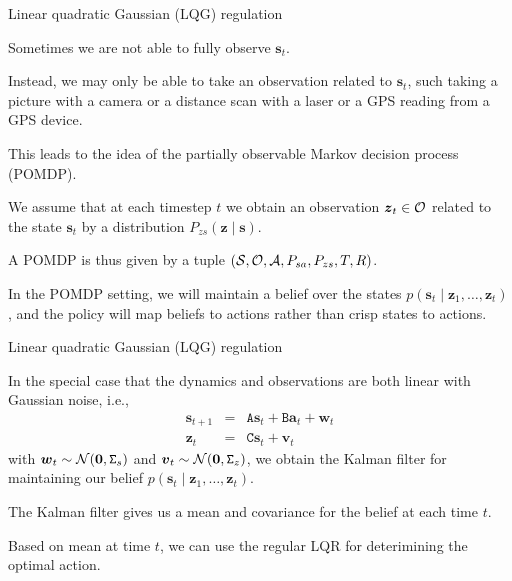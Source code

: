 \documentclass{beamer}
\renewcommand{\vec}[1]{\boldsymbol{#1}}
\newcommand{\mat}[1]{\mathtt{#1}}
\begin{document}
\begin{frame}{Linear quadratic Gaussian (LQG) regulation}

  Sometimes we are not able to fully observe $\vec{s}_t$.

  \medskip

  Instead, we may only be able to take an \alert{observation} related
  to $\vec{s}_t$, such taking a picture with a camera or a distance
  scan with a laser or a GPS reading from a GPS device.

  \medskip

  This leads to the idea of the \alert{partially observable Markov
    decision process (POMDP)}.

  \medskip

  We assume that at each timestep $t$ we obtain an observation
  $\vec{z}_t \in {\cal O}$ related to the state $\vec{s}_t$ by a distribution
  $P_{zs}(\vec{z} \mid \vec{s})$.

  \medskip

  A POMDP is thus given by a tuple $({\cal S},{\cal O},{\cal
    A},P_{sa},P_{zs},T,R)$.

  \medskip
  
  In the POMDP setting, we will maintain a \alert{belief} over the states
  $p(\vec{s}_t \mid \vec{z}_1, \ldots, \vec{z}_t)$, and the policy will map
  beliefs to actions rather than crisp states to actions.
  
\end{frame}


\begin{frame}{Linear quadratic Gaussian (LQG) regulation}

  In the special case that the dynamics and observations are both linear
  with Gaussian noise, i.e.,
  \begin{eqnarray*}
    \vec{s}_{t+1} & = & \mat{A}\vec{s}_t + \mat{B}\vec{a}_t + \vec{w}_t \\
    \vec{z}_t & = & \mat{C}\vec{s}_t + \vec{v}_t
  \end{eqnarray*}
  with $\vec{w}_t \sim {\cal N}(\vec{0},\mat{\Sigma}_s)$ and
  $\vec{v}_t \sim {\cal N}(\vec{0},\mat{\Sigma}_z)$, we obtain the
  \alert{Kalman filter} for maintaining our belief $p(\vec{s}_t \mid \vec{z}_1,
  \ldots,\vec{z}_t)$.

  \medskip

  The Kalman filter gives us a mean and covariance for the belief at
  each time $t$.

  \medskip

  Based on mean at time $t$, we can use the regular LQR for
  deterimining the optimal action.

\end{frame}
\end{document}
